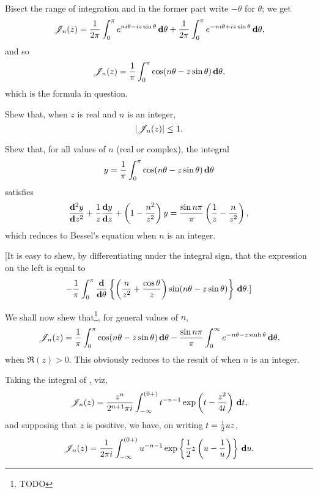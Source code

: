 Bisect the range of integration and in the former part write
$-\theta$ for $\theta$; we get
$$
\mathscr{J}_{n}(z)
=
\frac{1}{2\pi}
\int_{0}^{\pi}
e^{n i \theta - i z \sin\theta}
\, \mathbf{d} \theta
+
\frac{1}{2\pi}
\int_{0}^{\pi}
e^{-n i \theta + i z \sin\theta}
\, \mathbf{d} \theta,
$$
and so
$$
\mathscr{J}_{n}(z)
=
\frac{1}{\pi}
\int_{0}^{\pi}
\cos (n \theta - z \sin \theta)
\, \mathbf{d} \theta,
$$
which is the formula in question.
\begin{wandwexample}
  Shew that, when $z$ is real and $n$ is an integer,
  $$
  \left|  \mathscr{J}_{n}(z)  \right| \leq 1.
  $$
\end{wandwexample}
\begin{wandwexample}
  Shew that, for all values of $n$ (real or complex), the integral
  $$
  y
  =
  \frac{1}{\pi}
  \int_{0}^{\pi}
  \cos (n \theta - z \sin \theta)
  \, \mathbf{d} \theta
  $$
  satisfies
  $$
  \frac{\mathbf{d}^{2} y}{\mathbf{d} z^{2}}
  +
  \frac{1}{z}
  \frac{\mathbf{d} y}{\mathbf{d} z}
  +
  \left(  1 - \frac{n^{2}}{z^{2}}  \right) y
  =
  \frac{ \sin n\pi }{\pi}
  \left(  \frac{1}{z} - \frac{n}{z^{2}}   \right),
  $$
  which reduces to Bessel's equation when $n$ is an integer.

  [It is easy to shew, by differentiating under the integral sign, that
  the expression on the left is equal to
  $$
  -
  \frac{1}{\pi}
  \int_{0}^{\pi}
  \frac{\mathbf{d}}{\mathbf{d}\theta}
  \left\{  \left(  \frac{n}{z^{2}} + \frac{\cos\theta}{z}   \right)
    \sin(n\theta - z \sin\theta) \right\}
  \, \mathbf{d} \theta
  .]
  $$
\end{wandwexample}
%
We shall now shew that\footnote{TODO}, for general values of $n$,
\begin{equation}
  \mathscr{J}_{n}(z)
  =
  \frac{1}{\pi}
  \int_{0}^{\pi} \cos(n\theta - z\sin\theta) \, \mathbf{d}\theta
  -
  \frac{\sin n\pi}{\pi}
  \int_{0}^{\infty} e^{-n\theta - z\sinh\theta} \, \mathbf{d}\theta,
\end{equation}
when $\Re(z) > 0$. This obviously reduces to the result of
 when $n$ is an integer.

Taking the integral of , viz,
$$
\mathscr{J}_{n}(z)
=
\frac{z^{n}}{2^{n+1}\pi i}
\int_{-\infty}^{(0+)}
t^{-n-1}
\exp\left(  t - \frac{z^{2}}{4t}   \right)
\, \mathbf{d} t,
$$
%
%
and supposing that $z$ is positive, we have, on writing
$t = \frac{1}{2} u z$,
$$
\mathscr{J}_{n}(z)
=
\frac{1}{2\pi i}
\int_{-\infty}^{(0+)}
u^{-n-1}
\exp \left\{  \frac{1}{2} z \left(  u - \frac{1}{u}   \right)   \right\}
\, \mathbf{d} u.
$$


